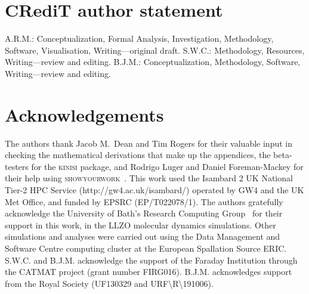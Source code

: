 \documentclass[reprint,superscriptaddress,nobibnotes,amsmath,amssymb,aps,prx,hidelinks]{revtex4-2}
\begin{document}
\section*{CR\lowercase{e}d\lowercase{i}T author statement}

A.R.M.: Conceptualization, Formal Analysis, Investigation, Methodology, Software, Visualisation, Writing---original draft.
S.W.C.: Methodology, Resources, Writing---review and editing.
B.J.M.: Conceptualization, Methodology, Software, Writing---review and editing.

\section*{Acknowledgements}

The authors thank Jacob M.\ Dean and Tim Rogers for their valuable input in checking the mathematical derivations that make up the appendices, the beta-testers for the \textsc{kinisi} package, and Rodrigo Luger and Daniel Foreman-Mackey for their help using \textsc{showyourwork}~\cite{luger_showyourwork_2021}.
This work used the Isambard 2 UK National Tier-2 HPC Service (http://gw4.ac.uk/isambard/) operated by GW4 and the UK Met Office, and funded by EPSRC (EP/T022078/1).
The authors gratefully acknowledge the University of Bath's Research Computing Group~\cite{bath_research_2018} for their support in this work, in the LLZO molecular dynamics simulations.
Other simulations and analyses were carried out using the Data Management and Software Centre computing cluster at the European Spallation Source ERIC.
S.W.C. and B.J.M. acknowledge the support of the Faraday Institution through the CATMAT project (grant number FIRG016). 
B.J.M. acknowledges support from the Royal Society (UF130329 and URF\textbackslash R\textbackslash 191006). 



\let\addcontentsline\oldaddcontentsline

\onecolumngrid
\clearpage 
\twocolumngrid

\appendix
\renewcommand\thesection{SI.\Roman{section}}
\renewcommand\thefigure{SI.\arabic{figure}}
\setcounter{figure}{0}
\renewcommand\theequation{SI.\arabic{equation}}
\setcounter{equation}{0}
\renewcommand\thetable{SI.\arabic{table}}
\setcounter{table}{0}
\renewcommand\thepage{SI.\arabic{page}}
\end{document}
